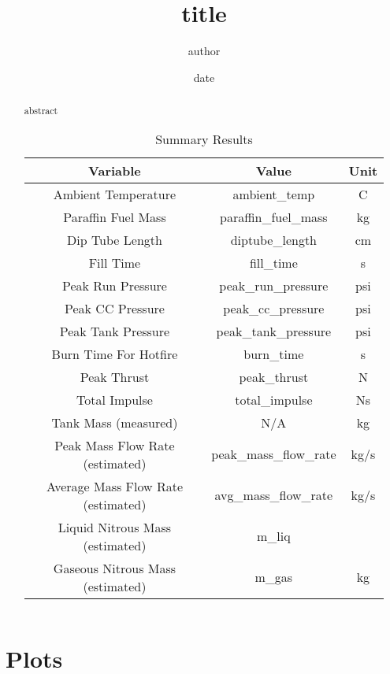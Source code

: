 \documentclass[letterpaper,12pt]{article}
\begin{document}
\title{{{ title }}}
\author{{{ author }}}
\date{{{ date }}}
\maketitle

\begin{abstract}
{{ abstract }}

\begin{table}[H]
\begin{center}
\caption{Summary Results}
\label{tbl:issues}
\begin{tabular}{|c|c|c|}
\hline
\textbf{Variable} & \textbf{Value} & \textbf{Unit} \\
\hline
Ambient Temperature & {{ ambient_temp }} & C \\
\hline
Paraffin Fuel Mass & {{ paraffin_fuel_mass }} & kg \\
\hline
Dip Tube Length & {{ diptube_length }} & cm \\
\hline
Fill Time & {{ fill_time }} & s \\
\hline
Peak Run Pressure & {{ peak_run_pressure }} & psi \\
\hline
Peak CC Pressure & {{ peak_cc_pressure }} & psi \\
\hline
Peak Tank Pressure & {{ peak_tank_pressure }} & psi \\
\hline
Burn Time For Hotfire & {{ burn_time }} & s \\
\hline
Peak Thrust & {{ peak_thrust }} & N \\
\hline
Total Impulse & {{ total_impulse }} & Ns \\
\hline
Tank Mass (measured) & N/A & kg \\
\hline
Peak Mass Flow Rate (estimated) & {{ peak_mass_flow_rate }} & kg/s \\
\hline
Average Mass Flow Rate (estimated) & {{ avg_mass_flow_rate }} & kg/s \\
\hline
Liquid Nitrous Mass (estimated) & {{ m_liq }} &  \\
\hline
Gaseous Nitrous Mass (estimated) & {{ m_gas }} & kg \\
\hline
\end{tabular}
\end{center}
\end{table}

\end{abstract}

\section{Plots}
\end{document}
